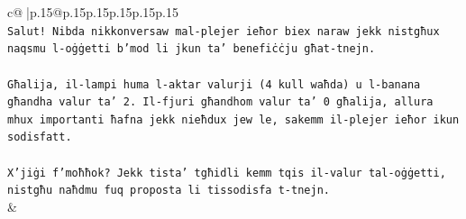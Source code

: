 \documentclass{article}
\begin{document}
{\begin{supertabular}{c@{$\;$}|p{.15\linewidth}@{}p{.15\linewidth}p{.15\linewidth}p{.15\linewidth}p{.15\linewidth}p{.15\linewidth}}
{{{\\ 
\texttt{Salut! Nibda nikkonversaw mal{-}plejer ieħor biex naraw jekk nistgħux naqsmu l{-}oġġetti b'mod li jkun ta' benefiċċju għat{-}tnejn.} \\
\\ 
\texttt{Għalija, il{-}lampi huma l{-}aktar valurji (4 kull waħda) u l{-}banana għandha valur ta' 2. Il{-}fjuri għandhom valur ta' 0 għalija, allura mhux importanti ħafna jekk nieħdux jew le, sakemm il{-}plejer ieħor ikun sodisfatt.} \\
\\ 
\texttt{X'jiġi f'moħħok? Jekk tista' tgħidli kemm tqis il{-}valur tal{-}oġġetti, nistgħu naħdmu fuq proposta li tissodisfa t{-}tnejn.} \\
            }
        }
    }
    & \\ \\


\end{supertabular}}
\end{document}
